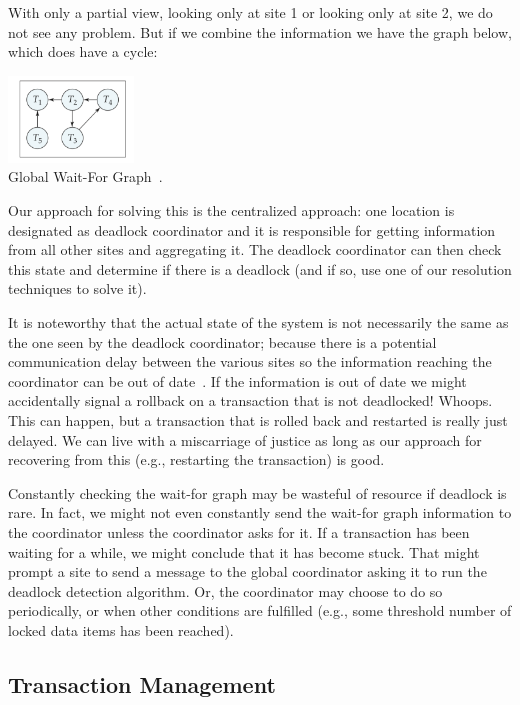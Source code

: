 With only a partial view, looking only at site 1 or looking only at site 2, we do not see any problem. But if we combine the information we have the graph below, which does have a cycle:

\begin{center}
\includegraphics[width=0.25\textwidth]{images/waitfor-global}\\
Global Wait-For Graph~\cite{dsc}.
\end{center}

Our approach for solving this is the centralized approach: one location is designated as deadlock coordinator and it is responsible for getting information from all other sites and aggregating it. The deadlock coordinator can then check this state and determine if there is a deadlock (and if so, use one of our resolution techniques to solve it).

It is noteworthy that the actual state of the system is not necessarily the same as the one seen by the deadlock coordinator; because there is a potential communication delay between the various sites so the information reaching the coordinator can be out of date~\cite{dsc}. If the information is out of date we might accidentally signal a rollback on a transaction that is not deadlocked! Whoops. This can happen, but a transaction that is rolled back and restarted is really just delayed. We can live with a miscarriage of justice as long as our approach for recovering from this (e.g., restarting the transaction) is good.

Constantly checking the wait-for graph may be wasteful of resource if deadlock is rare. In fact, we might not even constantly send the wait-for graph information to the coordinator unless the coordinator asks for it. If a transaction has been waiting for a while, we might conclude that it has become stuck. That might prompt a site to send a message to the global coordinator asking it to run the deadlock detection algorithm. Or, the coordinator may choose to do so periodically, or when other conditions are fulfilled (e.g., some threshold number of locked data items has been reached). 

\subsection*{Transaction Management}

